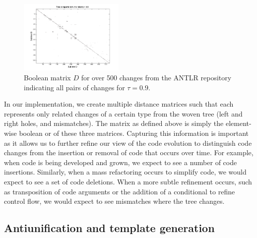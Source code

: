 \begin{figure}
\begin{center}
\includegraphics[width=0.45\textwidth]{figures/distmatrix-0-9.png}
\caption{Boolean matrix $D$ for over 500 changes from the ANTLR repository indicating all pairs of
changes for $\tau = 0.9$.}
\label{fig:boolmat}
\end{center}
\end{figure}

In our implementation, we create multiple distance matrices such that each
represents only related changes of a certain type from the woven tree (left
and right holes, and mismatches).  The matrix as defined above is simply the
element-wise boolean or of these three matrices.  Capturing this information is
important as it allows us to further refine our view of the code evolution to
distinguish code changes from the insertion or removal of code that occurs
over time. For example, when code is being developed and grown, we expect to
see a number of code insertions. Similarly, when a mass refactoring occurs to
simplify code, we would expect to see a set of code deletions.  When a more
subtle refinement occurs, such as transposition of code arguments or the
addition of a conditional to refine control flow, we would expect to see
mismatches where the tree changes.


\subsection{Antiunification and template generation}

